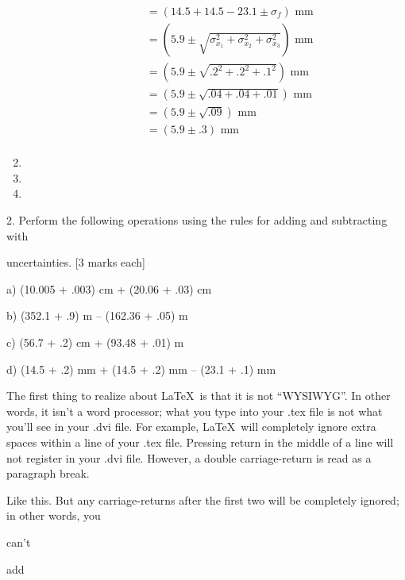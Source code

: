 \documentclass{article}
\begin{document}
\begin{enumerate}
\begin{enumerate}
\begin{align*}
&= (14.5 + 14.5 - 23.1 \pm \sigma_{f})\text{ mm}\\
&= (5.9 \pm \sqrt{\sigma_{x_{1}}^2 + \sigma_{x_{2}}^2 + \sigma_{x_{3}}^2})\text{ mm}\\
&= (5.9 \pm \sqrt{.2^2 + .2^2 + .1^2})\text{ mm}\\
&= (5.9 \pm \sqrt{.04 + .04 + .01})\text{ mm}\\
&= (5.9 \pm \sqrt{.09})\text{ mm}\\
&= (5.9 \pm .3)\text{ mm}\\
\end{align*}
\end{enumerate}
\item
\item
\item
\end{enumerate}



2. Perform the following operations using the rules for adding and subtracting with 

uncertainties. [3 marks each]

a) (10.005 + .003) cm + (20.06 + .03) cm 

b) (352.1 + .9) m – (162.36 + .05) m 

c) (56.7 + .2) cm + (93.48 + .01) m 

d) (14.5 + .2) mm + (14.5 + .2) mm – (23.1 + .1) mm















The first thing to realize about \LaTeX\ is that it is not ``WYSIWYG''.
In other words, it isn't a word processor; what you type into your 
.tex file is not what you'll see in your .dvi file.  For example, 
\LaTeX\ will      completely     ignore               extra
spaces    within                             a line of your .tex file.
Pressing return
in 
the 
middle 
of
a
line
will not register in your .dvi file. However, a double carriage-return
is read as a paragraph break.

Like this.  But any carriage-returns after the first two will be 
completely ignored; in other words, you 


can't 

add
\end{document}
